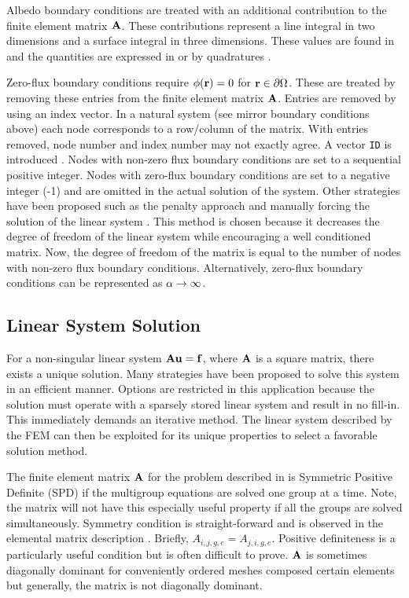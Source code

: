     Albedo boundary conditions are treated with an additional contribution to 
    the finite element matrix $\mathbf{A}$. These contributions represent a line 
    integral in two dimensions and a surface integral in three dimensions. These
    values are found in  and the quantities are 
    expressed in  or by quadratures 
    .
    
    Zero-flux boundary conditions require $\phi(\mathbf{r}) = 0$ for 
    $\mathbf{r} \in \partial \Omega$. These are treated by removing these entries from
    the finite element matrix $\mathbf{A}$. Entries are removed by using an index 
    vector. In a natural system (see mirror boundary conditions above) each node
    corresponds to a row/column of the matrix. With entries removed, node number
    and index number may not exactly agree. A vector \texttt{ID} is introduced
    \cite{textbookjohnson}. Nodes with non-zero flux boundary conditions are set
    to a sequential positive integer. Nodes with zero-flux boundary conditions 
    are set to a negative integer (-1) and are omitted in the actual solution of 
    the system. Other strategies have been proposed such as the penalty approach 
    \cite{textbookhughes} and manually forcing the solution of the linear system 
    \cite{textbookli}. This method is chosen because it decreases the degree of 
    freedom of the linear system while encouraging a well conditioned matrix. 
    Now, the degree of freedom of the matrix is equal to the number of nodes 
    with non-zero flux boundary conditions. Alternatively, zero-flux boundary
    conditions can be represented as $\alpha \rightarrow \infty$.
    
  \subsection{Linear System Solution}
    \label{sec:linear_system_solution}
    For a non-singular linear system $\mathbf{A} \mathbf{u} = \mathbf{f}$, where $\mathbf{A}$ is a square 
    matrix, there exists a unique solution. Many strategies have been proposed 
    to solve this system in an efficient manner. Options are restricted in this
    application because the solution must operate with a sparsely stored linear 
    system and result in no fill-in. This immediately demands an iterative 
    method. The linear system described by the FEM can then be exploited for its 
    unique properties to select a favorable solution method.
    
    The finite element matrix $\mathbf{A}$ for the problem described in 
     is Symmetric Positive Definite (SPD) if the
    multigroup equations are solved one group at a time. Note, the matrix will
    not have this especially useful property if all the groups are solved
    simultaneously. Symmetry condition is straight-forward and is observed in 
    the elemental matrix description . Briefly,
    $A_{i,j,g,e}=A_{j,i,g,e}$.
    Positive definiteness is a particularly useful condition but is often 
    difficult to prove. $\mathbf{A}$ is sometimes diagonally dominant for conveniently
    ordered meshes composed certain elements but generally, the matrix is not 
    diagonally dominant. 
    
